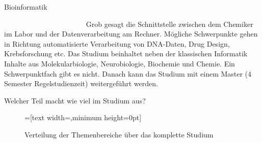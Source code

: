 
\begin{Huge}
    Bioinformatik
\end{Huge}

\begin{exampleblock}{\textcolor{white}{Was ist der Studiengang?}}
    Grob gesagt die Schnittstelle zwischen dem Chemiker im Labor und der Datenverarbeitung am Rechner. Mögliche Schwerpunkte gehen in Richtung automatisierte Verarbeitung von DNA-Daten, Drug Design, Krebsforschung etc.
    Das Studium beinhaltet neben der klassischen Informatik Inhalte aus Molekularbiologie, Neurobiologie, Biochemie und Chemie. Ein Schwerpunktfach gibt es nicht. Danach kann das Studium mit einem Master (4 Semester Regelstudienzeit) weitergeführt werden.
\end{exampleblock}

\begin{block}{Welcher Teil macht wie viel im Studium aus?}
    \begin{figure}[h!]
        \begin{minipage}{\linewidth}
            \centering
            =[text width={},minimum height=0pt]
        \end{minipage}
        \vspace{-20pt}
	\caption{Verteilung der Themenbereiche über das komplette Studium}
    \end{figure}
\end{block}

